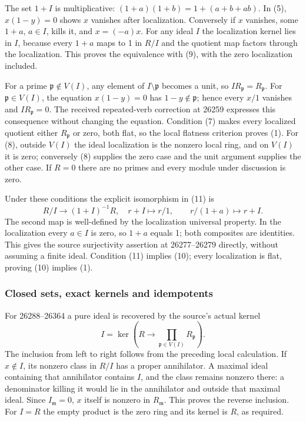 The set \(1+I\) is multiplicative: \((1+a)(1+b)=1+(a+b+ab)\). In (5), \(x(1-y)=0\) shows \(x\) vanishes after localization. Conversely if \(x\) vanishes, some \(1+a\), \(a\in I\), kills it, and \(x=(-a)x\). For any ideal \(I\) the localization kernel lies in \(I\), because every \(1+a\) maps to 1 in \(R/I\) and the quotient map factors through the localization. This proves the equivalence with (9), with the zero localization included.

For a prime \(\mathfrak p\notin V(I)\), any element of \(I\setminus\mathfrak p\) becomes a unit, so \(IR_{\mathfrak p}=R_{\mathfrak p}\). For \(\mathfrak p\in V(I)\), the equation \(x(1-y)=0\) has \(1-y\notin\mathfrak p\); hence every \(x/1\) vanishes and \(IR_{\mathfrak p}=0\). The received repeated-verb correction at 26259 expresses this consequence without changing the equation. Condition (7) makes every localized quotient either \(R_{\mathfrak p}\) or zero, both flat, so the local flatness criterion proves (1). For (8), outside \(V(I)\) the ideal localization is the nonzero local ring, and on \(V(I)\) it is zero; conversely (8) supplies the zero case and the unit argument supplies the other case. If \(R=0\) there are no primes and every module under discussion is zero.

Under these conditions the explicit isomorphism in (11) is \[
R/I\longrightarrow(1+I)^{-1}R,\quad r+I\mapsto r/1,
\qquad r/(1+a)\longmapsto r+I .
\] The second map is well-defined by the localization universal property. In the localization every \(a\in I\) is zero, so \(1+a\) equals 1; both composites are identities. This gives the source surjectivity assertion at 26277--26279 directly, without assuming a finite ideal. Condition (11) implies (10); every localization is flat, proving (10) implies (1).

\subsubsection{Closed sets, exact kernels and idempotents}\label{algebra-proof-022-closed-sets-exact-kernels-and-idempotents}

For 26288--26364 a pure ideal is recovered by the source's actual kernel \[
I=\ker\left(R\longrightarrow\prod_{\mathfrak p\in V(I)}R_{\mathfrak p}\right).
\] The inclusion from left to right follows from the preceding local calculation. If \(x\notin I\), its nonzero class in \(R/I\) has a proper annihilator. A maximal ideal containing that annihilator contains \(I\), and the class remains nonzero there: a denominator killing it would lie in the annihilator and outside that maximal ideal. Since \(I_{\mathfrak m}=0\), \(x\) itself is nonzero in \(R_{\mathfrak m}\). This proves the reverse inclusion. For \(I=R\) the empty product is the zero ring and its kernel is \(R\), as required.

